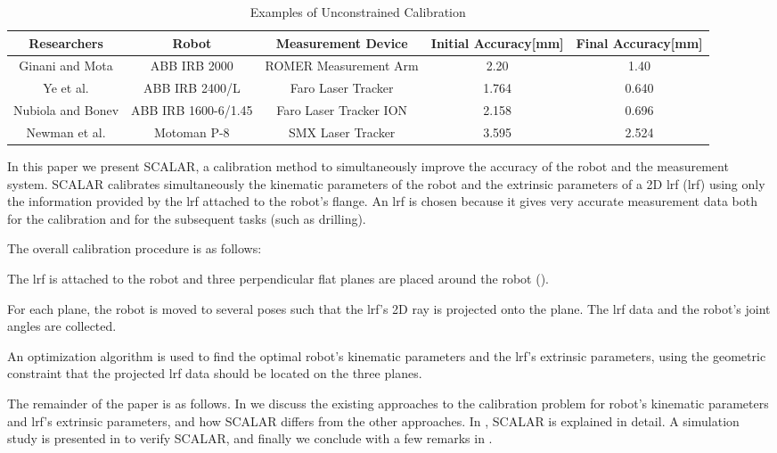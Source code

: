 \renewcommand{\arraystretch}{1.1}
\begin{table*}[htp]
\caption{Examples of Unconstrained Calibration}
\label{tab:unconstrained_calib}
\centering
\begin{tabular}{c c c c c}
\toprule
\textbf{Researchers} &  \textbf{Robot} & \textbf{Measurement Device} &  \textbf{Initial Accuracy[mm]}  & \textbf{Final Accuracy[mm]}\\
\midrule
Ginani and Mota \cite{Ginani2011} & ABB IRB 2000 & ROMER Measurement Arm & 2.20 & 1.40 \\
Ye et al. \cite{Ye2006} & ABB IRB 2400/L & Faro Laser Tracker & 1.764 & 0.640 \\
Nubiola and Bonev \cite{Nubiola2013} & ABB IRB 1600-6/1.45 & Faro Laser Tracker ION & 2.158 & 0.696 \\ 
Newman et al. \cite{Newman2000} & Motoman P-8 & SMX Laser Tracker & 3.595 & 2.524\\
\bottomrule
\end{tabular}
\end{table*}
In this paper we present SCALAR, a calibration method to simultaneously improve the accuracy of the robot and the measurement system. SCALAR calibrates simultaneously the kinematic parameters of the robot and the extrinsic parameters of a 2D \acl{lrf} (\ac{lrf}) using only the information provided by the \ac{lrf} attached to the robot's flange. An \ac{lrf} is chosen because it gives very accurate measurement data both for the calibration and for the subsequent tasks (such as drilling).  

The overall calibration procedure is as follows:
\begin{compactenum}
\item The \ac{lrf} is attached to the robot and three perpendicular flat planes are placed around the robot (). 
\item For each plane, the robot is moved to several poses such that the \ac{lrf}'s 2D ray is projected onto the plane. The \ac{lrf} data and the robot's joint angles are collected.
\item An optimization algorithm is used to find the optimal robot's kinematic parameters and the \ac{lrf}'s extrinsic parameters, using the geometric constraint that the projected \ac{lrf} data should be located on the three planes. 
\end{compactenum}

The remainder of the paper is as follows. In  we discuss the existing approaches to the calibration problem for robot's kinematic parameters and \ac{lrf}'s extrinsic parameters, and how SCALAR differs from the other approaches. In , SCALAR is explained in detail. A simulation study is presented in  to verify SCALAR, and finally we conclude with a few remarks in .  



